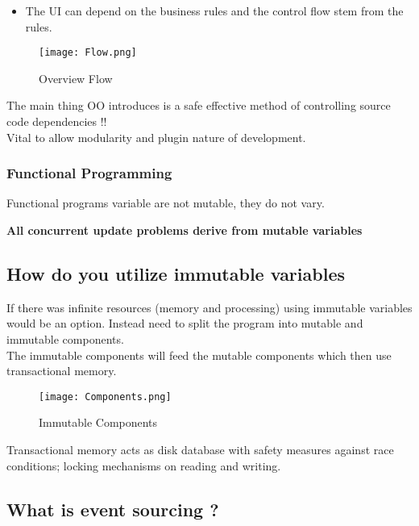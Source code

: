 \documentclass[11pt]{scrartcl} %
\begin{document}
\begin{itemize}
\item
  The UI can depend on the business rules and the control flow stem from
  the rules.
\end{itemize}

\begin{figure}[h] %
	\centering
	\texttt{[image: Flow.png]} %
	\caption{Overview Flow}
\end{figure}

The main thing OO introduces is a safe effective method of controlling
source code dependencies !!\\

Vital to allow modularity and plugin nature of development.

\subsubsection{Functional Programming}

Functional programs variable are not mutable, they do not vary.

\textbf{All concurrent update problems derive from mutable variables}

\subsection{How do you utilize immutable variables}

If there was infinite resources (memory and processing) using immutable
variables would be an option. Instead need to split the program into
mutable and immutable components.\\

The immutable components will feed the mutable components which then use
transactional memory.\\

\begin{figure}[h] %
	\centering
	\texttt{[image: Components.png]} %
	\caption{Immutable Components}
\end{figure}

Transactional memory acts as disk database with safety measures against
race conditions; locking mechanisms on reading and writing.

\subsection{What is event sourcing ?}
\end{document}
